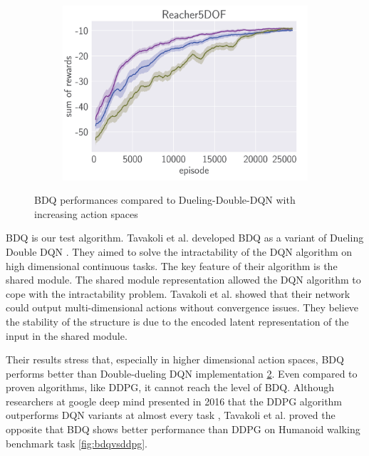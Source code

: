 \begin{figure}[htbp]
    \hspace*{\fill}   %
    \begin{subfigure}{0.31\textwidth}
      \includegraphics[width=\linewidth]{figures/BDQ3.png}
      \caption{} \label{fig:1b}
    \end{subfigure}%

\caption{BDQ performances compared to Dueling-Double-DQN with increasing action spaces \label{fig:BDQvsDDQN}}
\end{figure}

BDQ is our test algorithm. Tavakoli et al. developed BDQ as a variant of Dueling Double DQN \cite{Tavakoli2018}. They aimed to solve the intractability of the DQN algorithm on high dimensional continuous tasks. The key feature of their algorithm is the shared module. The shared module representation allowed the DQN algorithm to cope with the intractability problem. Tavakoli et al. showed that their network could output multi-dimensional actions without convergence issues. They believe the stability of the structure is due to the encoded latent representation of the input in the shared module.

Their results stress that, especially in higher dimensional action spaces, BDQ performs better than Double-dueling DQN implementation \ref{fig:BDQvsDDQN}. Even compared to proven algorithms, like DDPG, it cannot reach the level of BDQ. Although researchers at google deep mind presented in 2016 that the DDPG algorithm outperforms DQN variants at almost every task \cite{Lillicrap2016}, Tavakoli et al. proved the opposite that BDQ shows better performance than DDPG on Humanoid walking benchmark task \ref{fig:bdqvsddpg}.

